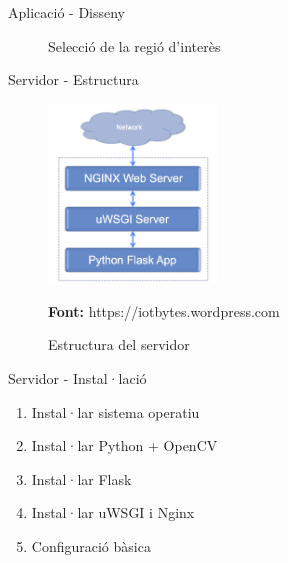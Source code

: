 \documentclass[xcolor=table, 11pt]{beamer}
\newcommand*{\captionsource}[2]{%
  \caption[{#1}]{#1}\par
  \vspace{-0.4cm}
  \tiny{\textbf{Font:} #2\par}}
\newcommand\tz{\fontsize{13}{15.6}\selectfont}
\begin{document}
	\begin{frame}{Aplicació - Disseny}
		\tz
		\centering
		\begin{figure}[H]
			\caption{Selecció de la regió d'interès}
		\end{figure}
	\end{frame}


	\begin{frame}{Servidor - Estructura}
		\tz
		\centering
		\begin{figure}
			\includegraphics[width=0.4\textwidth]{images/server}
			\vspace{0.2cm}
			\captionsource{Estructura del servidor}{https://iotbytes.wordpress.com}
		\end{figure}
	\end{frame}

	\begin{frame}{Servidor - Instal·lació}
		\tz
		\begin{enumerate}
			\item{Instal·lar sistema operatiu}
			\item{Instal·lar Python + OpenCV}
			\item{Instal·lar Flask}
			\item{Instal·lar uWSGI i Nginx}
			\item{Configuració bàsica}
		\end{enumerate}
	\end{frame}
\end{document}
